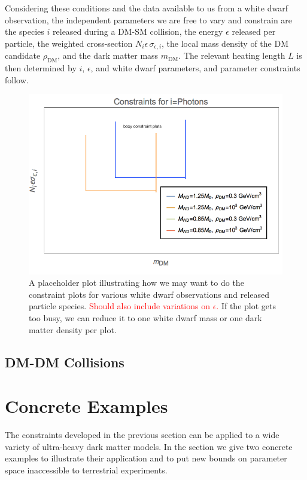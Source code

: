\documentclass[twocolumn,showpacs,preprintnumbers,amsmath,amssymb,prd]{revtex4}
\begin{document}
Considering these conditions and the data available to us from a white dwarf observation, the independent parameters we are free to vary and constrain are the species $i$ released during a DM-SM collision, the energy $\epsilon$ released per particle, the weighted cross-section $N_i \epsilon\, \sigma_{\epsilon,i}$, the local mass density of the DM candidate $\rho_\text{DM}$, and the dark matter mass $m_\text{DM}$. The relevant heating length $L$ is then determined by $i$, $\epsilon$, and white dwarf parameters, and parameter constraints follow.

\begin{figure}
  \includegraphics[scale=0.65]{dummy_constraint_plot.png}
  \caption{A placeholder plot illustrating how we may want to do the constraint plots for various white dwarf observations and released particle species. \textcolor{red}{Should also include variations on $\epsilon$.} If the plot gets too busy, we can reduce it to one white dwarf mass or one dark matter density per plot.}
  \label{fig:PhotonConstraints 1}
\end{figure}

\subsection{DM-DM Collisions}
\label{sec:CollisionConstraints}


\section{Concrete Examples}
\label{sec:ConcreteExamples}

The constraints developed in the previous section can be applied to a wide variety of ultra-heavy dark matter models. In the section we give two concrete examples to illustrate their application and to put new bounds on parameter space inaccessible to terrestrial experiments.
\end{document}
